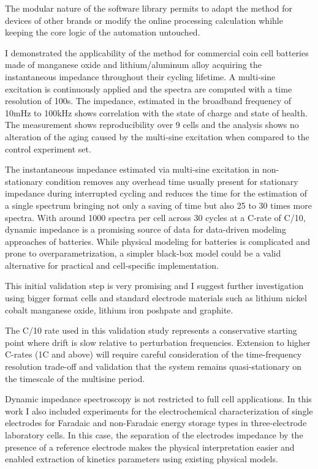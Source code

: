 The modular nature of the software library permits to adapt the method for devices of other brands or modify the online processing calculation whihle keeping the core logic of the automation untouched.

I demonstrated the applicability of the method for commercial coin cell batteries made of manganese oxide and lithium/aluminum alloy acquiring the instantaneous impedance throughout their cycling lifetime. A multi-sine excitation is continuously applied and the spectra are computed with a time resolution of 100s. The impedance, estimated in the broadband frequency of 10mHz to 100kHz shows correlation with the state of charge and state of health. The measurement shows reproducibility over 9 cells and the analysis shows no alteration of the aging caused by the multi-sine excitation when compared to the control experiment set.

The instantaneous impedance estimated via multi-sine excitation in non-stationary condition removes any overhead time usually present for stationary impedance during interrupted cycling and reduces the time for the estimation of a single spectrum bringing not only a saving of time but also 25 to 30 times more spectra. With around 1000 spectra per cell across 30 cycles at a C-rate of C/10, dynamic impedance is a promising source of data for data-driven modeling approaches of batteries. While physical modeling for batteries is complicated and prone to overparametrization, a simpler black-box model could be a valid alternative for practical and cell-specific implementation.

This initial validation step is very promising and I suggest further investigation using bigger format cells and standard electrode materials such as lithium nickel cobalt manganese oxide, lithium iron poshpate and graphite.

The C/10 rate used in this validation study represents a conservative starting point where drift is slow relative to perturbation frequencies. Extension to higher C-rates (1C and above) will require careful consideration of the time-frequency resolution trade-off and validation that the system remains quasi-stationary on the timescale of the multisine period.

Dynamic impedance spectroscopy is not restricted to full cell applications. In this work I also included experiments for the electrochemical characterization of single electrodes for Faradaic and non-Faradaic energy storage types in three-electrode laboratory cells. In this case, the separation of the electrodes impedance by the presence of a reference electrode makes the physical interpretation easier and enabled extraction of kinetics parameters using existing physical models.

